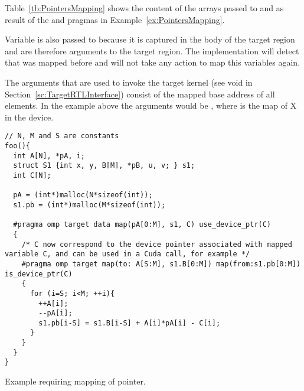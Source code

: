 Table~\ref{tb:PointersMapping} shows the content of the arrays passed to  and  as result of the \dtargetdata{} and \dtarget{} pragmas in Example~\ref{ex:PointersMapping}.

 Variable  is also passed to  because it is captured in the body of the target region and are therefore arguments to the target region. The \libomptarget{} implementation will detect that  was mapped before and will not take any action to map this variables again.

The arguments that are used to invoke the target kernel (see void  in Section~\ref{sc:TargetRTLInterface}) consist of the mapped base address of all elements. In the example above the arguments would be , where  is the map of {X} in the device.

\begin{example}
\lstset{basicstyle=\scriptsize,frame=single}
\begin{lstlisting}
// N, M and S are constants
foo(){
  int A[N], *pA, i;
  struct S1 {int x, y, B[M], *pB, u, v; } s1;
  int C[N];
  
  pA = (int*)malloc(N*sizeof(int)); 
  s1.pb = (int*)malloc(M*sizeof(int)); 

  #pragma omp target data map(pA[0:M], s1, C) use_device_ptr(C)
  { 
    /* C now correspond to the device pointer associated with mapped variable C, and can be used in a Cuda call, for example */
    #pragma omp target map(to: A[S:M], s1.B[0:M]) map(from:s1.pb[0:M]) is_device_ptr(C)
    {
      for (i=S; i<M; ++i){ 
        ++A[i]; 
        --pA[i]; 
        s1.pb[i-S] = s1.B[i-S] + A[i]*pA[i] - C[i]; 
      }
    }
  }
}
\end{lstlisting}
\lstset{basicstyle=\small\bfseries,frame=none}
\caption{Example requiring mapping of pointer.}
\label{ex:PointersMapping}
\end{example}

